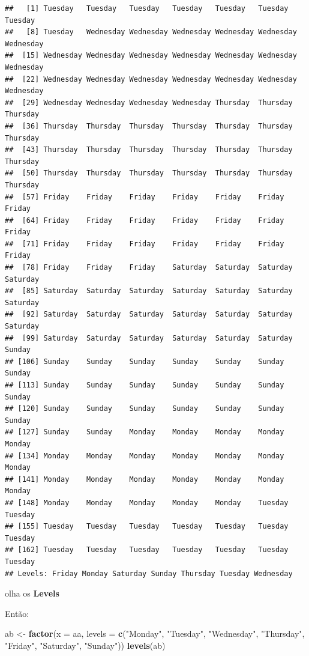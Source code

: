 \documentclass[]{book}
\newenvironment{Shaded}{\begin{snugshade}}{\end{snugshade}}
\newcommand{\KeywordTok}[1]{\textcolor[rgb]{0.13,0.29,0.53}{\textbf{#1}}}
\newcommand{\DataTypeTok}[1]{\textcolor[rgb]{0.13,0.29,0.53}{#1}}
\newcommand{\StringTok}[1]{\textcolor[rgb]{0.31,0.60,0.02}{#1}}
\newcommand{\NormalTok}[1]{#1}
\begin{document}
\begin{verbatim}
##   [1] Tuesday   Tuesday   Tuesday   Tuesday   Tuesday   Tuesday   Tuesday  
##   [8] Tuesday   Wednesday Wednesday Wednesday Wednesday Wednesday Wednesday
##  [15] Wednesday Wednesday Wednesday Wednesday Wednesday Wednesday Wednesday
##  [22] Wednesday Wednesday Wednesday Wednesday Wednesday Wednesday Wednesday
##  [29] Wednesday Wednesday Wednesday Wednesday Thursday  Thursday  Thursday 
##  [36] Thursday  Thursday  Thursday  Thursday  Thursday  Thursday  Thursday 
##  [43] Thursday  Thursday  Thursday  Thursday  Thursday  Thursday  Thursday 
##  [50] Thursday  Thursday  Thursday  Thursday  Thursday  Thursday  Thursday 
##  [57] Friday    Friday    Friday    Friday    Friday    Friday    Friday   
##  [64] Friday    Friday    Friday    Friday    Friday    Friday    Friday   
##  [71] Friday    Friday    Friday    Friday    Friday    Friday    Friday   
##  [78] Friday    Friday    Friday    Saturday  Saturday  Saturday  Saturday 
##  [85] Saturday  Saturday  Saturday  Saturday  Saturday  Saturday  Saturday 
##  [92] Saturday  Saturday  Saturday  Saturday  Saturday  Saturday  Saturday 
##  [99] Saturday  Saturday  Saturday  Saturday  Saturday  Saturday  Sunday   
## [106] Sunday    Sunday    Sunday    Sunday    Sunday    Sunday    Sunday   
## [113] Sunday    Sunday    Sunday    Sunday    Sunday    Sunday    Sunday   
## [120] Sunday    Sunday    Sunday    Sunday    Sunday    Sunday    Sunday   
## [127] Sunday    Sunday    Monday    Monday    Monday    Monday    Monday   
## [134] Monday    Monday    Monday    Monday    Monday    Monday    Monday   
## [141] Monday    Monday    Monday    Monday    Monday    Monday    Monday   
## [148] Monday    Monday    Monday    Monday    Monday    Tuesday   Tuesday  
## [155] Tuesday   Tuesday   Tuesday   Tuesday   Tuesday   Tuesday   Tuesday  
## [162] Tuesday   Tuesday   Tuesday   Tuesday   Tuesday   Tuesday   Tuesday  
## Levels: Friday Monday Saturday Sunday Thursday Tuesday Wednesday
\end{verbatim}

olha os \textbf{Levels}

Então:

\begin{Shaded}
\begin{Highlighting}[]
\NormalTok{ab <-}\StringTok{ }\KeywordTok{factor}\NormalTok{(}\DataTypeTok{x =}\NormalTok{ aa,}
             \DataTypeTok{levels =} \KeywordTok{c}\NormalTok{(}\StringTok{"Monday"}\NormalTok{, }\StringTok{"Tuesday"}\NormalTok{,  }\StringTok{"Wednesday"}\NormalTok{,  }\StringTok{"Thursday"}\NormalTok{,}
                        \StringTok{"Friday"}\NormalTok{, }\StringTok{"Saturday"}\NormalTok{, }\StringTok{"Sunday"}\NormalTok{))}
\KeywordTok{levels}\NormalTok{(ab)}
\end{Highlighting}
\end{Shaded}
\end{document}
